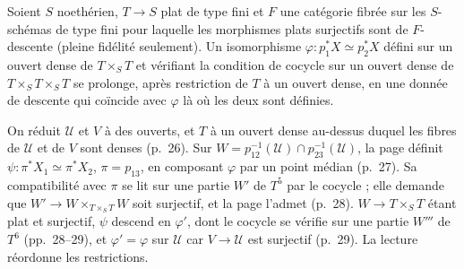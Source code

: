 \begin{encadre}
\begin{theoreme*}\nonverifie
Soient $S$ noethérien, $T \to S$ plat de type fini et $F$ une catégorie fibrée sur les $S$-schémas de type fini pour laquelle les morphismes plats surjectifs sont de $F$-descente (pleine fidélité seulement). Un isomorphisme $\varphi : p_1^*X \simeq p_2^*X$ défini sur un ouvert dense de $T \times_S T$ et vérifiant la condition de cocycle sur un ouvert dense de $T \times_S T \times_S T$ se prolonge, après restriction de $T$ à un ouvert dense, en une donnée de descente qui coïncide avec $\varphi$ là où les deux sont définies.
\end{theoreme*}
\end{encadre}
\begin{demopage}[pages 26 à 29]
On réduit $\mathcal U$ et $V$ à des ouverts, et $T$ à un ouvert dense au-dessus duquel les fibres de $\mathcal U$ et de $V$ sont denses (p.~26). Sur $W = p_{12}^{-1}(\mathcal U) \cap p_{23}^{-1}(\mathcal U)$, la page définit $\psi : \pi^*X_1 \simeq \pi^*X_2$, $\pi = p_{13}$, en composant $\varphi$ par un point médian (p.~27). Sa compatibilité avec $\pi$ se lit sur une partie $W'$ de $T^5$ par le cocycle ; elle demande que $W' \to W \times_{T \times_S T} W$ soit surjectif, et la page l'admet  (p.~28). $W \to T \times_S T$ étant plat et surjectif, $\psi$ descend en $\varphi'$, dont le cocycle se vérifie sur une partie $W'''$ de $T^6$ (pp.~28--29), et $\varphi' = \varphi$ sur $\mathcal U$ car $V \to \mathcal U$ est surjectif (p.~29). La lecture réordonne les restrictions.
\end{demopage}
